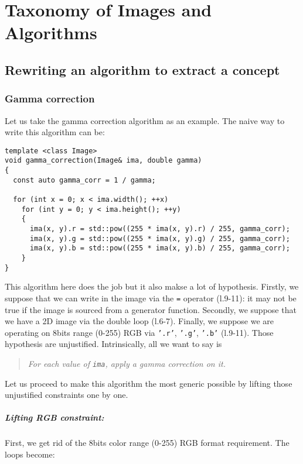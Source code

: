 \chapter{Taxonomy of Images and Algorithms}



\section{Rewriting an algorithm to extract a concept}



\subsection{Gamma correction}

Let us take the gamma correction algorithm as an example. The naive way to write this algorithm can be:

\begin{verbatim}
template <class Image>
void gamma_correction(Image& ima, double gamma)
{
  const auto gamma_corr = 1 / gamma;

  for (int x = 0; x < ima.width(); ++x)
    for (int y = 0; y < ima.height(); ++y)
    {
      ima(x, y).r = std::pow((255 * ima(x, y).r) / 255, gamma_corr);
      ima(x, y).g = std::pow((255 * ima(x, y).g) / 255, gamma_corr);
      ima(x, y).b = std::pow((255 * ima(x, y).b) / 255, gamma_corr);
    }
}
\end{verbatim}

\noindent This algorithm here does the job but it also makse a lot of hypothesis. Firstly, we suppose that we can write
in the image via the \texttt{=} operator (l.9-11): it may not be true if the image is sourced from a generator function.
Secondly, we suppose that we have a 2D image via the double loop (l.6-7). Finally, we suppose we are operating on 8bits
range (0-255) RGB via \texttt{'.r'}, \texttt{'.g'}, \texttt{'.b'} (l.9-11). Those hypothesis are unjustified.
Intrinsically, all we want to say is \blockquote{\emph{For each value of \texttt{ima}, apply a gamma correction on
    it.}}. Let us proceed to make this algorithm the most generic possible by lifting those unjustified constraints one by
one.



\paragraph{Lifting RGB constraint:}
First, we get rid of the 8bits color range (0-255) RGB format requirement. The loops become:

